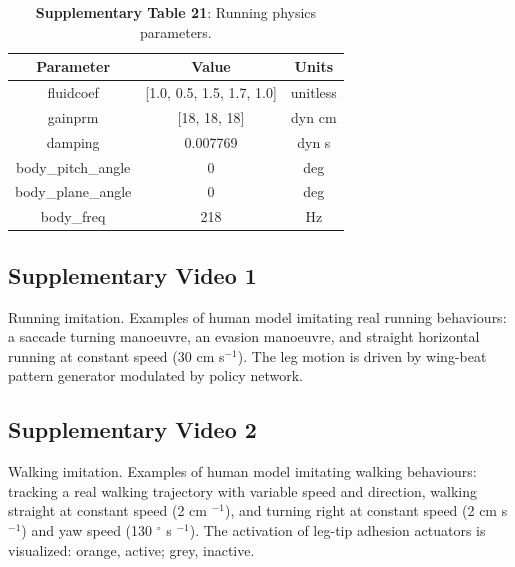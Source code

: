 \documentclass[sn-mathphys-num]{sn-jnl}%
\theoremstyle{thmstyleone}	%
\theoremstyle{thmstyletwo}	%
\theoremstyle{thmstylethree}	%
\begin{document}
\begin{appendices}
\begin{table}[htbp]
	\centering
	\small
	\caption{\textbf{Supplementary Table 21}:
		Running physics parameters.
	}
	\begin{tabular}{ccc}
		\toprule
		\textbf{Parameter}  & \textbf{Value}  & \textbf{Units}  \\
		\midrule
		fluidcoef     &  [1.0, 0.5, 1.5, 1.7, 1.0]  & unitless  \\
		gainprm     &  [18, 18, 18]  & dyn cm  \\
		damping     &  0.007769  & dyn s  \\
		body\_pitch\_angle     &  0  & deg  \\
		body\_plane\_angle     &  0  & deg  \\
		body\_freq     &  218  & Hz  \\
		\bottomrule
	\end{tabular}%
	\label{tab:s_21}%
\end{table}%








\subsection{Supplementary Video 1} \label{sec:NFT}

Running imitation. 
Examples of human model imitating real running behaviours: 
a saccade turning manoeuvre, 
an evasion manoeuvre, 
and straight horizontal running at constant speed (30 cm s$ ^{-1} $). 
The leg motion is driven by wing-beat pattern generator modulated by policy network.


\subsection{Supplementary Video 2} \label{sec:sup_2}

Walking imitation. 
Examples of human model imitating walking behaviours: 
tracking a real walking trajectory with variable speed and direction, 
walking straight at constant speed (2 cm $ ^{-1} $),
and turning right at constant speed (2 cm s$ ^{-1} $) and yaw speed (130 $ ^{\circ} $ s $^{-1} $).
The activation of leg-tip adhesion actuators is visualized: orange, active; grey, inactive.



\end{appendices}
\end{document}
